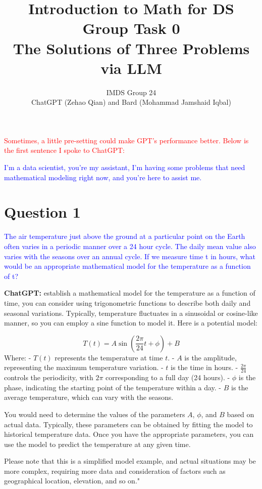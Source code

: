 \documentclass[11pt]{article} %
\title{Introduction to Math for DS Group Task 0 \\ The Solutions of Three Problems via LLM}
\author{IMDS Group 24 \\ ChatGPT (Zehao Qian) and Bard (Mohammad Jamshaid Iqbal)}
\begin{document}
\maketitle

\textcolor{red}{Sometimes, a little pre-setting could make GPT’s performance better. Below is the first sentence I spoke to ChatGPT:} \par
\textcolor{blue}{I'm a data scientist, you're my assistant, I'm having some problems that need mathematical modeling right now, and you're here to assist me.}

\section{Question 1}
\textcolor{blue}{The air temperature just above the ground at a particular point on the Earth often varies in a periodic manner over a 24 hour cycle. The daily mean value also varies with the seasons over an annual cycle. If we measure time t in hours, what would be an appropriate mathematical model for the temperature as a function of t? }

\begin{mdframed}[
        backgroundcolor=white,  %
        linecolor=black,        %
        leftmargin=5pt,         %
        rightmargin=5pt,        %
        linewidth=2pt           %
    ]
    \textbf{ChatGPT: } establish a mathematical model for the temperature as a function of time, you can consider using trigonometric functions to describe both daily and seasonal variations. Typically, temperature fluctuates in a sinusoidal or cosine-like manner, so you can employ a sine function to model it. Here is a potential model: \par
    \[T(t) = A \sin\left(\frac{2\pi}{24} t + \phi\right) + B\]
    Where:
    - \(T(t)\) represents the temperature at time \(t\).
    - \(A\) is the amplitude, representing the maximum temperature variation.
    - \(t\) is the time in hours.
    - \(\frac{2\pi}{24}\) controls the periodicity, with \(2\pi\) corresponding to a full day (24 hours).
    - \(\phi\) is the phase, indicating the starting point of the temperature within a day.
    - \(B\) is the average temperature, which can vary with the seasons. \par
    You would need to determine the values of the parameters \(A\), \(\phi\), and \(B\) based on actual data. Typically, these parameters can be obtained by fitting the model to historical temperature data. Once you have the appropriate parameters, you can use the model to predict the temperature at any given time. \par
    Please note that this is a simplified model example, and actual situations may be more complex, requiring more data and consideration of factors such as geographical location, elevation, and so on."
\end{mdframed}
\end{document}
